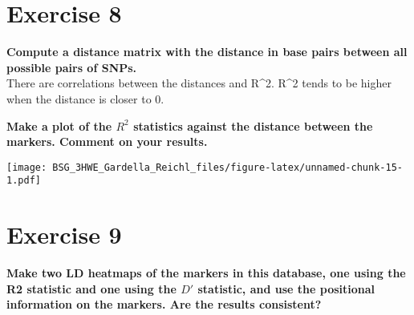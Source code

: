 \documentclass[]{article}
\newenvironment{Shaded}{\begin{snugshade}}{\end{snugshade}}
\newcommand{\KeywordTok}[1]{\textcolor[rgb]{0.13,0.29,0.53}{\textbf{#1}}}
\newcommand{\DataTypeTok}[1]{\textcolor[rgb]{0.13,0.29,0.53}{#1}}
\newcommand{\DecValTok}[1]{\textcolor[rgb]{0.00,0.00,0.81}{#1}}
\newcommand{\StringTok}[1]{\textcolor[rgb]{0.31,0.60,0.02}{#1}}
\newcommand{\OtherTok}[1]{\textcolor[rgb]{0.56,0.35,0.01}{#1}}
\newcommand{\ControlFlowTok}[1]{\textcolor[rgb]{0.13,0.29,0.53}{\textbf{#1}}}
\newcommand{\OperatorTok}[1]{\textcolor[rgb]{0.81,0.36,0.00}{\textbf{#1}}}
\newcommand{\NormalTok}[1]{#1}
\begin{document}
\section{Exercise 8}\label{exercise-8}

\textbf{Compute a distance matrix with the distance in base pairs
between all possible pairs of SNPs.}\\
There are correlations between the distances and R\^{}2. R\^{}2 tends to
be higher when the distance is closer to 0.

\begin{Shaded}
\end{Shaded}

\textbf{Make a plot of the \(R^2\) statistics against the distance
between the markers. Comment on your results.}

\texttt{[image: BSG\_3HWE\_Gardella\_Reichl\_files/figure-latex/unnamed-chunk-15-1.pdf]}

\section{Exercise 9}\label{exercise-9}

\textbf{Make two LD heatmaps of the markers in this database, one using
the R2 statistic and one using the \(D'\) statistic, and use the
positional information on the markers. Are the results consistent?}
\end{document}
